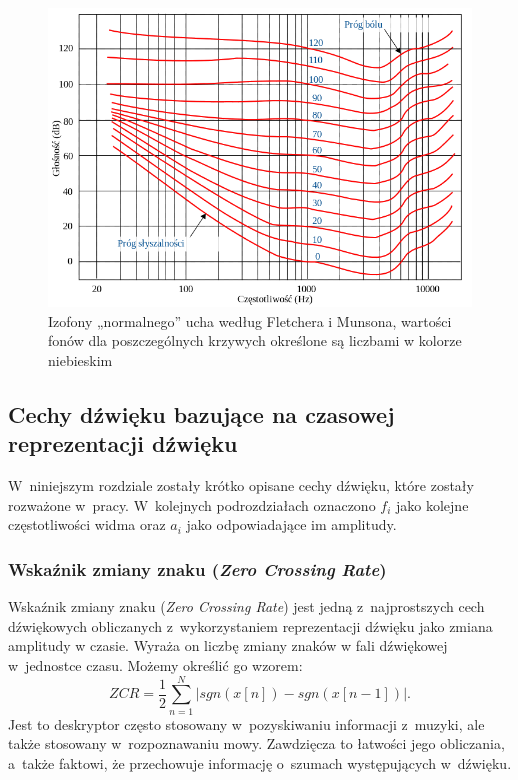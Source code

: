 \begin{figure}[ht!]
\centering
\includegraphics[scale=0.5]{res/equalLoudness.png}
\caption[Caption for LOF]{Izofony „normalnego” ucha według Fletchera i Munsona\footnotemark, wartości fonów dla poszczególnych krzywych określone są liczbami w kolorze niebieskim\label{izofony}
}
\end{figure}


\subsection{Cechy dźwięku bazujące na czasowej reprezentacji dźwięku}
W~niniejszym rozdziale zostały krótko opisane cechy dźwięku, które zostały rozważone w~pracy. W~kolejnych podrozdziałach oznaczono $f_i$ jako kolejne częstotliwości widma oraz $a_i$ jako odpowiadające im amplitudy.
\subsubsection{Wskaźnik zmiany znaku (\emph{Zero Crossing Rate})}
Wskaźnik zmiany znaku (\emph{Zero Crossing Rate}) jest jedną z~najprostszych cech dźwiękowych obliczanych z~wykorzystaniem reprezentacji dźwięku jako zmiana amplitudy w czasie. Wyraża on liczbę zmiany znaków w fali dźwiękowej w~jednostce czasu. Możemy określić go wzorem:
\begin{equation}
ZCR = \frac{1}{2} \sum^{N}_{n=1} |sgn(x[n]) - sgn(x[n-1])|.
\end{equation}
Jest to deskryptor często stosowany w~pozyskiwaniu informacji z~muzyki, ale także stosowany w~rozpoznawaniu mowy. Zawdzięcza to łatwości jego obliczania, a~także faktowi, że przechowuje informację o~szumach występujących w~dźwięku\cite{phdWork}.

